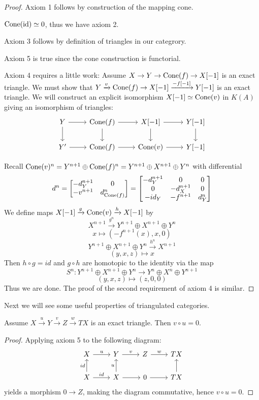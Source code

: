 \documentclass[a4paper, UKenglish]{report}
\begin{document}
\begin{proof}
Axiom 1 follows by construction of the mapping cone.

$\operatorname{Cone}(\operatorname{id}) \simeq 0$, thus we have axiom 2.

Axiom 3 follows by definition of triangles in our categrory.

Axiom 5 is true since the cone construction is functorial.

Axiom 4 requires a little work:
Assume  $X \to Y \to \operatorname{Cone}(f) \to X[-1]$ is an exact triangle. We must show that  $Y \xrightarrow{v} \operatorname{Cone}(f) \to X[-1] \xrightarrow{-f[-1]} Y[-1]$ is an exact triangle. We will construct an explicit isomorphism $X[-1] \simeq \operatorname{Cone}(v)$ in $K(A)$ giving an isomorphism of triangles:
\[
\begin{tikzcd}
Y \ar{d} \ar{r} & \Cone(f) \ar{d} \ar{r} & X[-1] \arrow{d} \ar{r} & \ar{d} Y[-1] \\
Y' \ar{r} & \Cone(f) \ar{r} & \Cone(v) \ar{r} & Y[-1] 
\end{tikzcd}
\]

Recall $\operatorname{Cone}(v)^n = Y^{n+1} \oplus \operatorname{Cone}(f)^n = Y^{n+1} \oplus X^{n+1} \oplus Y^n$ with differential 
\[ d^n = \begin{bmatrix} -d_Y^{n+1} & 0 \\ -v^{n+1} & d_{\operatorname{Cone}(f)}^n \end{bmatrix}=\begin{bmatrix} -d_Y^{n+1} & 0 &  0 \\ 0 & -d_X^{n+1} & 0 \\ -id_Y & -f^{n+1} & d_Y^n \end{bmatrix} \]
We define maps $ X[-1] \xrightarrow{g} \operatorname{Cone}(v) \xrightarrow{h} X[-1]$ by
\[ X^{n+1} \xrightarrow{g^n}   Y^{n+1} \oplus X^{n+1} \oplus Y^n \]
\[ x \mapsto (-f^{n+1}(x),x,0) \]
\[ Y^{n+1} \oplus X^{n+1} \oplus Y^n \xrightarrow{h^n}   X^{n+1}  \]
\[ (y,x,z) \mapsto x \]
Then $h \circ g = id$ and $g \circ h$ are homotopic to the identity via the map
\[ S^n: Y^{n+1} \oplus X^{n+1} \oplus Y^n \to Y^n \oplus X^n \oplus Y^{n+1} \]
\[ (y,x,z) \mapsto (z,0,0) \]
Thus we are done. The proof of the second requirement of axiom 4 is similar.
\end{proof}

Next we will see some useful properties of triangulated categories.

\begin{proposition} \label{compzero}
Assume $X \xrightarrow{u}  Y \xrightarrow{v} Z \xrightarrow{w} TX$ is an exact triangle. Then $v \circ u = 0$.
\end{proposition}
\begin{proof}
Applying axiom 5 to the following diagram:
\[
\begin{tikzcd}
X  \ar{r}{u} & Y  \ar{r}{v} & Z  \ar{r}{w} &  TX \\
X \ar{u}{id} \ar{r}{id} & X \ar{u}{u} \ar{r} & 0 \ar{r} & \ar{u} TX 
\end{tikzcd}
\]
yields a morphism $0 \to Z$, making the diagram commutative, hence $v \circ u = 0$.
\end{proof}
\end{document}
